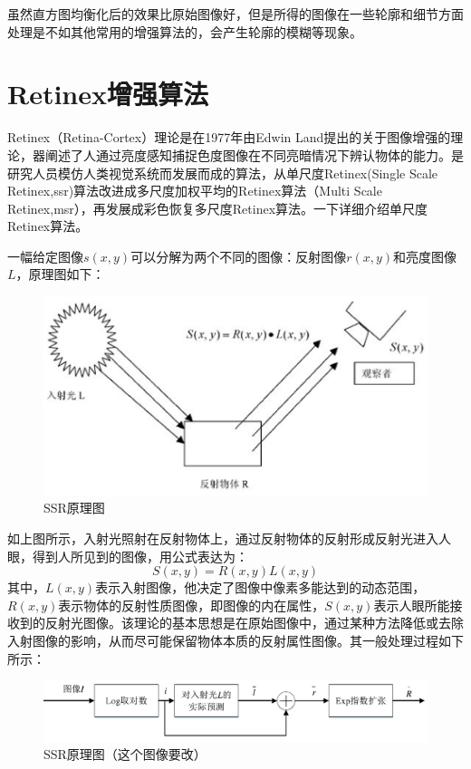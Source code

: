 \documentclass[12pt]{book}
\begin{document}
虽然直方图均衡化后的效果比原始图像好，但是所得的图像在一些轮廓和细节方面处理是不如其他常用的增强算法的，会产生轮廓的模糊等现象。
		\section{Retinex增强算法}	Retinex（Retina-Cortex）理论是在1977年由Edwin Land提出的关于图像增强的理论，器阐述了人通过亮度感知捕捉色度图像在不同亮暗情况下辨认物体的能力。是研究人员模仿人类视觉系统而发展而成的算法，从单尺度Retinex(Single Scale Retinex,ssr)算法改进成多尺度加权平均的Retinex算法（Multi Scale Retinex,msr），再发展成彩色恢复多尺度Retinex算法。一下详细介绍单尺度Retinex算法。

一幅给定图像$s(x,y)$可以分解为两个不同的图像：反射图像$r(x,y)$和亮度图像$L$，原理图如下：
			\begin{figure}[!ht]\centering
				\includegraphics[totalheight=60mm]{./figures/retinexSSR.png}
				\caption{SSR原理图\label{SSR}}
			\end{figure}

如上图所示，入射光照射在反射物体上，通过反射物体的反射形成反射光进入人眼，得到人所见到的图像，用公式表达为：
\begin{equation}     S(x,y)=R(x,y)L(x,y)    \end{equation}	
其中，$L(x,y)$表示入射图像，他决定了图像中像素多能达到的动态范围，$R(x,y)$表示物体的反射性质图像，即图像的内在属性，$S(x,y)$表示人眼所能接收到的反射光图像。该理论的基本思想是在原始图像中，通过某种方法降低或去除入射图像的影响，从而尽可能保留物体本质的反射属性图像。其一般处理过程如下所示：
			\begin{figure}[!ht]\centering
				\includegraphics[totalheight=30mm,width=160mm]{./figures/retinexSSR1.png}
				\caption{SSR原理图（这个图像要改）\label{SSR}}
			\end{figure}
\end{document}
